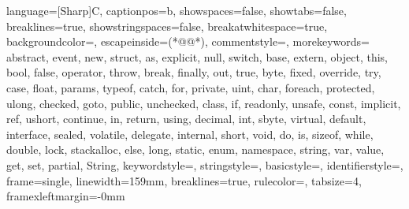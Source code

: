 \usepackage{listings}
 {
language=[Sharp]C,
captionpos=b,
showspaces=false,
showtabs=false,
breaklines=true,
showstringspaces=false,
breakatwhitespace=true,
backgroundcolor=\color{gray!10},
escapeinside={(*@}{@*)},
commentstyle=\color{greencomments},
morekeywords={  abstract, event, new, struct,
                as, explicit, null, switch,
                base, extern, object, this,
                bool, false, operator, throw,
                break, finally, out, true,
                byte, fixed, override, try,
                case, float, params, typeof,
                catch, for, private, uint,
                char, foreach, protected, ulong,
                checked, goto, public, unchecked,
                class, if, readonly, unsafe,
                const, implicit, ref, ushort,
                continue, in, return, using,
                decimal, int, sbyte, virtual,
                default, interface, sealed, volatile,
                delegate, internal, short, void,
                do, is, sizeof, while,
                double, lock, stackalloc,
                else, long, static,
                enum, namespace, string, var, 
                value, get, set, partial, String},
keywordstyle=\color{bluekeywords},
stringstyle=\color{redstrings},
basicstyle=\ttfamily\small,
identifierstyle=\color{sblue},
frame=single,
linewidth=159mm,
breaklines=true,
rulecolor=\color{black!40},
tabsize=4,
framexleftmargin=-0mm
}





